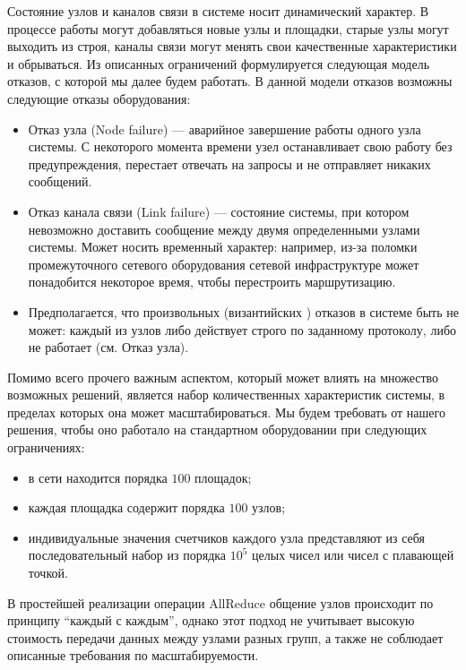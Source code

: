 \documentclass{article}
\theoremstyle{plain}
\theoremstyle{plain}
\theoremstyle{plain}
\theoremstyle{plain}
\theoremstyle{definition}
\theoremstyle{remark}
\theoremstyle{plain}
\begin{document}
Состояние узлов и каналов связи в системе носит динамический характер. В процессе работы могут добавляться новые узлы и площадки, старые узлы могут выходить из строя, каналы связи могут менять свои качественные характеристики и обрываться. Из описанных ограничений формулируется следующая модель отказов, с которой мы далее будем работать. В данной модели отказов возможны следующие отказы оборудования:

\begin{itemize}
    \item Отказ узла (Node failure) — аварийное завершение работы одного узла системы. С некоторого момента времени узел останавливает свою работу без предупреждения, перестает отвечать на запросы и не отправляет никаких сообщений.
    
    \item Отказ канала связи (Link failure) — состояние системы, при котором невозможно доставить сообщение между двумя определенными узлами системы. Может носить временный характер: например, из-за поломки промежуточного сетевого оборудования сетевой инфраструктуре может понадобится некоторое время, чтобы перестроить маршрутизацию.
    
    \item Предполагается, что произвольных (византийских \cite{lamport1982byzantine}) отказов в системе быть не может: каждый из узлов либо действует строго по заданному протоколу, либо не работает (см. Отказ узла).
\end{itemize}

Помимо всего прочего важным аспектом, который может влиять на множество возможных решений, является набор количественных характеристик системы, в пределах которых она может масштабироваться. Мы будем требовать от нашего решения, чтобы оно работало на стандартном оборудовании при следующих ограничениях:

\begin{itemize}
    \item в сети находится порядка $100$ площадок;
    \item каждая площадка содержит порядка $100$ узлов;
    \item индивидуальные значения счетчиков каждого узла представляют из себя последовательный набор из порядка $10^5$ целых чисел или чисел с плавающей точкой.
\end{itemize}

В простейшей реализации операции AllReduce общение узлов происходит по принципу \enquote{каждый с каждым}, однако этот подход не учитывает высокую стоимость передачи данных между узлами разных групп, а также не соблюдает описанные требования по масштабируемости.
\end{document}
